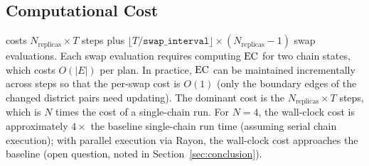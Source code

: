 \subsection{Computational Cost}

\pt{} costs $N_{\mathrm{replicas}} \times T$ \fr{} steps plus
$\lfloor T / \mathtt{swap\_interval} \rfloor \times (N_{\mathrm{replicas}}-1)$
swap evaluations.
Each swap evaluation requires computing $\mathrm{EC}$ for two chain states, which costs
$O(|E|)$ per plan.
In practice, $\mathrm{EC}$ can be maintained incrementally across \fr{} steps so that
the per-swap cost is $O(1)$ (only the boundary edges of the changed district
pairs need updating).
The dominant cost is the $N_{\mathrm{replicas}} \times T$ \fr{} steps, which is
$N$ times the cost of a single-chain run.
For $N=4$, the wall-clock cost is approximately $4\times$ the baseline single-chain
run time (assuming serial chain execution); with parallel execution via Rayon,
the wall-clock cost approaches the baseline (open question, noted in
Section~\ref{sec:conclusion}).
